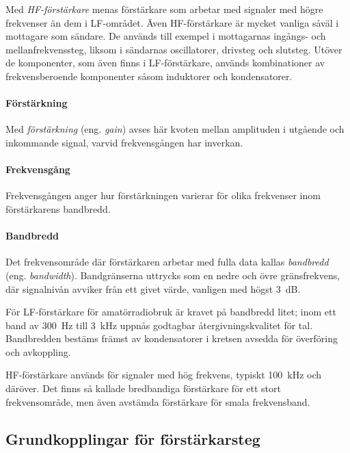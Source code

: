 Med \emph{HF-förstärkare} menas förstärkare som arbetar med signaler
med högre frekvenser än dem i LF-området.
Även HF-förstärkare är mycket vanliga såväl i mottagare som sändare.
De används till exempel i mottagarnas ingångs- och mellanfrekvenssteg, liksom i
sändarnas oscillatorer, drivsteg och slutsteg.
Utöver de komponenter, som även finns i LF-förstärkare, används kombinationer
av frekvensberoende komponenter såsom induktorer och kondensatorer.

\paragraph{Förstärkning}

Med \emph{förstärkning} (eng. \emph{gain}) avses här kvoten mellan amplituden i
utgående och inkommande signal, varvid frekvensgången har inverkan.

\paragraph{Frekvensgång}
Frekvensgången anger hur förstärkningen varierar för olika frekvenser inom förstärkarens bandbredd.

\paragraph{Bandbredd}

Det frekvensområde där förstärkaren arbetar med fulla data kallas
\emph{bandbredd} (eng. \emph{bandwidth}).
Bandgränserna uttrycks som en nedre och övre gränsfrekvens, där signalnivån
avviker från ett givet värde, vanligen med högst 3~dB.

För LF-förstärkare för amatörradiobruk är kravet på bandbredd litet; inom ett
band av 300~Hz till 3~kHz uppnås godtagbar återgivningskvalitet för tal.
Bandbredden bestäms främst av kondensatorer i kretsen avsedda för överföring
och avkoppling.

HF-förstärkare används för signaler med hög frekvens, typiskt 100~kHz och
däröver.
Det finns så kallade bredbandiga förstärkare för ett stort frekvensområde, men
även avstämda förstärkare för smala frekvensband.

\subsection{Grundkopplingar för förstärkarsteg}


